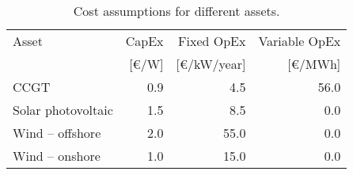 \begin{table}[h!]
\centering
\caption{Cost assumptions for different assets.}
\label{tab:cost-assumptions}
\begin{tabular}{lrrr}  \toprule
Asset & CapEx & Fixed OpEx & Variable OpEx\\
 & [€/W] & [€/kW/year] & [€/MWh]\\ \midrule
CCGT & 0.9 & 4.5 & 56.0\\
Solar photovoltaic & 1.5 & 8.5 & 0.0\\
Wind – offshore & 2.0 & 55.0 & 0.0\\
Wind – onshore & 1.0 & 15.0 & 0.0\\
 \bottomrule
\end{tabular}
\end{table}
